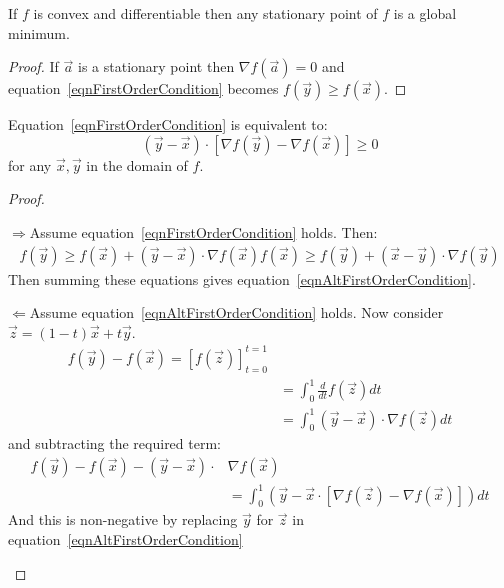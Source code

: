 \documentclass[../Main.tex]{subfiles}
\begin{document}
\begin{corollary}
    If $f$ is convex and differentiable then any stationary point of $f$ is a global minimum.
    \label{corConvexMinimum}
\end{corollary}
\begin{proof}
    If $\vec{a}$ is a stationary point then $\nabla f(\vec{a}) = 0$ and equation~\ref{eqnFirstOrderCondition} becomes $f(\vec{y}) \geq f(\vec{x})$.
\end{proof}
\begin{proposition}
    Equation~\ref{eqnFirstOrderCondition} is equivalent to:
    \begin{equation}
        (\vec{y} - \vec{x}) \cdot \left[\nabla f(\vec{y}) - \nabla f(\vec{x})\right] \geq 0
        \label{eqnAltFirstOrderCondition}
    \end{equation}
    for any $\vec{x}, \vec{y}$ in the domain of $f$.
    \label{propAltFirstOrderCondition}
\end{proposition}
\begin{proof}
    \begin{proofdirection}{$\Rightarrow$}{Assume equation~\ref{eqnFirstOrderCondition} holds.}
        Then:
        \begin{align*}
            f(\vec{y}) \geq f(\vec{x}) + (\vec{y} - \vec{x}) \cdot \nabla f(\vec{x})
            f(\vec{x}) \geq f(\vec{y}) + (\vec{x} - \vec{y}) \cdot \nabla f(\vec{y})
        \end{align*}
        Then summing these equations gives equation~\ref{eqnAltFirstOrderCondition}.
    \end{proofdirection}
    \begin{proofdirection}{$\Leftarrow$}{Assume equation~\ref{eqnAltFirstOrderCondition} holds.}
        Now consider $\vec{z} = (1 - t) \vec{x} + t \vec{y}$.
        \begin{align*}
            f(\vec{y}) - f(\vec{x}) = \left[f(\vec{z})\right]_{t=0}^{t=1} \\
            &= \int_0^1 \frac{d}{dt} f(\vec{z}) dt \\
            &= \int_0^1 (\vec{y} - \vec{x}) \cdot \nabla f(\vec{z}) dt
        \end{align*}
        and subtracting the required term:
        \begin{align*}
            f(\vec{y}) - f(\vec{x}) - (\vec{y} - \vec{x}) \cdot &\nabla f(\vec{x}) \\
            &= \int_0^1 \left(\vec{y} - \vec{x} \cdot \left[\nabla f(\vec{z}) - \nabla f(\vec{x})\right]\right)dt
        \end{align*}
        And this is non-negative by replacing $\vec{y}$ for $\vec{z}$ in equation~\ref{eqnAltFirstOrderCondition}
    \end{proofdirection}
\end{proof}
\end{document}

